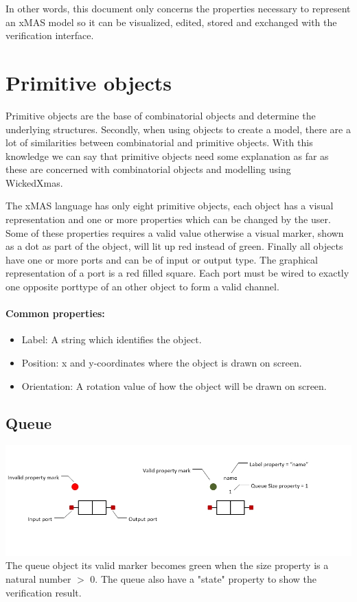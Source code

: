 \documentclass[a4paper,11pt,final]{article}
\begin{document}
In other words, this document only concerns
the properties necessary to represent an xMAS model so it can be visualized,
edited, stored and exchanged with the verification interface.
 

\newpage
\section{Primitive objects}
Primitive objects are the base of combinatorial objects and determine the underlying structures.
Secondly, when using objects to create a model, there are a lot of similarities between
combinatorial and primitive objects. With this knowledge we can say that
primitive objects need some explanation as far as these are concerned with
combinatorial objects and modelling using WickedXmas.

The xMAS language has only eight primitive objects,
each object has a visual representation and one or more properties which can be
changed by the user. Some of these properties requires a valid value otherwise a
visual marker, shown as a dot as part of the object, will lit up red instead of
green. Finally all objects have one or more ports and can be of input or output
type. The graphical representation of a port is a red filled square. Each port
must be wired to exactly one opposite porttype of an other object to form a valid
channel.

\paragraph{Common properties:}
\begin{itemize}
\item Label: A string which identifies the object.
\item Position: x and y-coordinates where the object is drawn on screen.
\item Orientation: A rotation value of how the object will be drawn on screen.
\end{itemize}

\subsection{Queue}
\includegraphics[width=1.0\textwidth]{queue}
The queue object its valid marker becomes green when the size property is a natural number $>$ 0. 
The queue also have a "state" property to show the verification result. 
\end{document}
